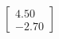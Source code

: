 \documentclass[preview]{standalone}
\begin{document}
\begin{align*}
\begin{bmatrix} 4.50 \\ -2.70 \end{bmatrix}
\end{align*}
\end{document}
